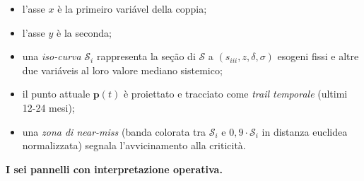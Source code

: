 \begin{itemize}
\tightlist
\item
  l'asse \(x\) è la primeiro variável della coppia;
\item
  l'asse \(y\) è la seconda;
\item
  una \emph{iso-curva} \(\mathcal{S}_i\) rappresenta la seção di
  \(\mathcal{S}\) a \((s_{iii}, z, \delta, \sigma)\) esogeni fissi e
  altre due variáveis al loro valore mediano sistemico;
\item
  il punto attuale \(\boldsymbol{p}(t)\) è proiettato e tracciato come
  \emph{trail temporale} (ultimi 12-24 mesi);
\item
  una \emph{zona di near-miss} (banda colorata tra \(\mathcal{S}_i\) e
  \(0{,}9 \cdot \mathcal{S}_i\) in distanza euclidea normalizzata)
  segnala l'avvicinamento alla criticità.
\end{itemize}

\Proved{} \textbf{I sei pannelli con interpretazione operativa.}

